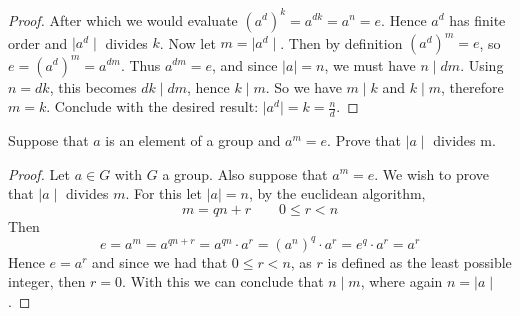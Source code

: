 \begin{assignment}[
  header=HeaderA,
  body=BodyA,
  title={Homework 1},
  duedate={3-February-2026},
  toc=false,
  toctitle={This appears on the Table of contents.},
  exlist=false
]
\begin{exer}[Problem 3.55]
\begin{proof}
After which we would evaluate $(a^d)^k = a^{dk} = a^n = e.$ Hence $a^d$ has finite order and $\mid a^d \mid$ divides $k$. Now let $m=\mid a^d\mid$. Then by definition $(a^d)^m=e$, so $e=(a^d)^m=a^{dm}$. Thus $a^{dm}=e$, and since $\mid a\mid =n$, we must have $n\mid dm$. Using $n=dk$, this becomes $dk\mid dm$, hence $k\mid m$.
So we have $m\mid k$ and $k\mid m$, therefore $m=k$. Conclude with the desired result: $\mid a^d\mid =k=\frac{n}{d}.$

\end{proof}
\end{exer}

\begin{exer}[Problem 3.67]
Suppose that $a$ is an element of a group and $a^m = e$. Prove that $\mid a\mid$ divides m.
\begin{proof}
Let $a \in G$ with $G$ a group. Also suppose that $a^m = e$. We wish to prove that $\mid a \mid$ divides $m$. For this let $|a| = n$, by the euclidean algorithm,
\[
m = qn + r \quad \quad 0 \leq r < n
\]
Then \[e = a^m = a^{qn +r} = a^{qn} \cdot a^{r} = (a^{n})^{q} \cdot a^{r} = e^q \cdot a^r  = a^r\]
Hence $e = a^r$ and since we had that $0 \leq r < n$,  as $r$ is defined as the least possible integer, then $r = 0$. With this we can conclude that  $n \mid m$, where again $n = \mid a \mid$.
\end{proof}    
\end{exer}


\end{assignment}
